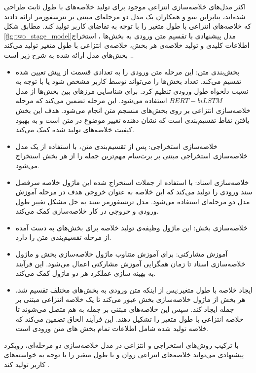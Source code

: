 اکثر مدل‌های خلاصه‌سازی انتزاعی موجود برای تولید خلاصه‌های با طول ثابت طراحی شده‌اند، بنابراین سو
و همکاران یک مدل دو مرحله‌ای مبتنی بر تنرسفورمر ارائه دادند که خلاصه‌های انتزاعی با طول متغیر را با توجه به تقاضای کاربر تولید کند. مطابق شکل  \ref{fig:two_stage_model}مدل پیشنهادی با تقسیم متن ورودی به بخش‌ها ، استخراج اطلاعات کلیدی و تولید خلاصه‌ی هر بخش، خلاصه‌ی انتزاعی با طول متغیر تولید می‌کند \cite{twostage}. بخش‌‌های مدل ارائه شده به شرح زیر است.
\begin{itemize}
	\item {
		بخش‌بندی متن: این مرحله متن ورودی را به تعدادی قسمت از پیش تعیین شده تقسیم می‌کند. تعداد بخش‌ها را می‌تواند توسط کاربر مشخص شود یا با توجه به نسبت دلخواه طول ورودی تنظیم کرد.
		برای شناسایی مرزهای بین بخش‌ها از مدل $ BERT-biLSTM $ استفاده می‌شود. این مرحله تضمین می‌کند که مرحله خلاصه‌سازی انتزاعی بر روی بخش‌های منسجم متن انجام می‌شود. هدف این بخش یافتن نقاط تقسیم‌بندی است که نشان دهنده تغییر موضوع در متن است و  به بهبود کیفیت خلاصه‌های تولید شده کمک می‌کند. 
	}
	\item {
		خلاصه‌سازی استخراجی: پس از تقسیم‌بندی متن، با استفاده از یک مدل خلاصه‌سازی استخراجی مبتنی بر برت‌سام
		مهم‌ترین جمله را از هر بخش استخراج می‌شود.
	}
	\item {
	خلاصه‌سازی اسناد: با استفاده از جملات استخراج شده این ماژول خلاصه سرفصل سند ورودی را تولید می‌کند که این خلاصه  به عنوان خروجی هدف در مرحله آموزش مدل دو مرحله‌ای استفاده می‌شود. مدل ترنسفورمر سند به حل مشکل تغییر طول ورودی و خروجی در کار خلاصه‌سازی کمک می‌کند.
	}
	\item{
	خلاصه‌سازی بخش: این ماژول وظیفه‌ی تولید خلاصه برای بخش‌های به دست آمده از مرحله تقسیم‌بندی متن را دارد.
}
\item{
آموزش مشارکتی:  برای آموزش متناوب ماژول خلاصه‌سازی بخش و ماژول خلاصه‌سازی اسناد تا زمان همگرایی آموزش مشارکتی اعمال می‌شود. این فرآیند به بهینه سازی عملکرد هر دو ماژول کمک می‌کند.}
\item{
	ایجاد خلاصه با طول متغیر:پس از اینکه متن ورودی به بخش‌های مختلف تقسیم شد، هر بخش از ماژول خلاصه‌سازی بخش عبور می‌کند تا یک خلاصه انتزاعی مبتنی بر جمله ایجاد کند. سپس این خلاصه‌های مبتنی بر جمله به هم متصل می‌شوند تا خلاصه انتزاعی با طول متغیر را تشکیل دهند. این فرآیند الحاق تضمین می‌کند که خلاصه تولید شده شامل اطلاعات تمام بخش های متن ورودی است.}
	
\end{itemize}
با ترکیب روش‌های استخراجی و انتزاعی در مدل خلاصه‌سازی دو مرحله‌ای، رویکرد پیشنهادی می‌تواند خلاصه‌های انتزاعی روان و با طول متغیر را با توجه به خواسته‌های کاربر تولید کند \cite{twostage}.




